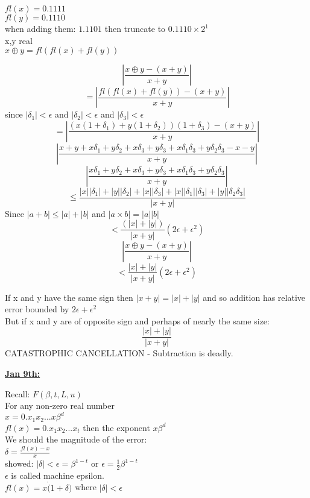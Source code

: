 \documentclass[12pt]{article}
\newcommand{\myt}[1]{\textbf{\underline{#1}}}
\begin{document}
	$fl(x) = 0.1111$\\
	$fl(y) = 0.1110$\\
	when adding them: $1.1101$ then truncate to $0.1110 \times 2^1$\\
	
	x,y real\\
	$x \oplus y = fl(fl(x) + fl(y))$
	
	$$|\frac{x \oplus y - (x + y)}{x + y}|$$
	$$ = |\frac{fl(fl(x) + fl(y)) - (x + y)}{x + y}|$$
	since $|\delta_1| < \epsilon$ and $|\delta_2| < \epsilon$ and $|\delta_3| < \epsilon$\\
	$$=|\frac{(x(1 + \delta_1) + y(1+\delta_2))(1+\delta_3) - (x+y)}{x + y}|$$
	$$|\frac{x + y + x\delta_1 + y\delta_2 + x\delta_3 + y\delta_3 + x\delta_1\delta_3 + y\delta_2\delta_3 - x - y}{x+y}|$$
	$$|\frac{x\delta_1 + y\delta_2 + x\delta_3 + y\delta_3 + x\delta_1\delta_3 + y\delta_2\delta_3}{x+y}|$$
	$$\le \frac{|x||\delta_1| + |y||\delta_2| + |x||\delta_3| + |x||\delta_1||\delta_3| + |y||\delta_2\delta_3|}{|x+y|}$$
	Since $|a+b| \le |a|+|b|$ and $|a \times b| = |a||b|$
	$$< \frac{(|x| + |y|)}{|x+y|}(2\epsilon + \epsilon^2)$$
	$$|\frac{x\oplus y - (x+y)}{x+y}|$$
	$$ < \frac{|x| + |y|}{|x+y|}(2\epsilon + \epsilon^2)$$
	
	If x and y have the same sign then $|x + y| = |x| + |y|$ and so addition has relative error bounded by $2\epsilon + \epsilon^2$\\
	
	But if x and y are of opposite sign and perhaps of nearly the same size:
	$$\frac{|x| + |y|}{|x + y|}$$
	CATASTROPHIC CANCELLATION - Subtraction is deadly.
	
	\myt{Jan 9th:}
	
	Recall: $F(\beta, t, L, u)$\\
	For any non-zero real number\\
	$x = 0.x_1x_2...x\beta^d$\\
	$fl(x) = 0.x_1x_2...x_t$ then the exponent $x\beta^d$\\
	
	We should the magnitude of the error:\\
	$\delta = \frac{fl(x) - x}{x}$\\
	showed: $|\delta| < \epsilon = \beta^{1-t}$ or $\epsilon = \frac{1}{2}\beta^{1-t}$\\
	$\epsilon$ is called machine epsilon.\\
	
	$fl(x) = x \dot (1 + \delta)$ where $|\delta| < \epsilon$\\
	
\end{document}
